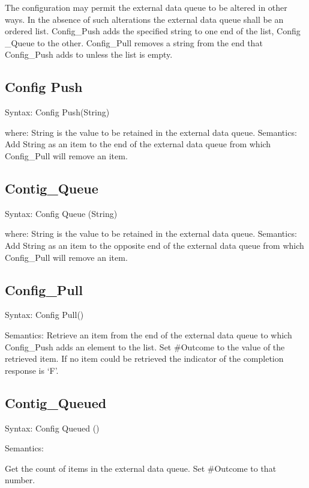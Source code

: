 The configuration may permit the external data queue to be altered in
other ways. In the absence of such alterations the external data queue
shall be an ordered list. Config\_Push adds the specified string to one
end of the list, Config \_Queue to the other. Config\_Pull removes a
string from the end that Config\_Push adds to unless the list is empty.

\hypertarget{config-push}{%
\subsection{Config Push}\label{config-push}}

Syntax: Config Push(String)

where: String is the value to be retained in the external data queue.
Semantics: Add String as an item to the end of the external data queue
from which Config\_Pull will remove an item.

\hypertarget{contig_queue}{%
\subsection{Contig\_Queue}\label{contig_queue}}

Syntax: Config Queue (String)

where: String is the value to be retained in the external data queue.
Semantics: Add String as an item to the opposite end of the external
data queue from which Config\_Pull will remove an item.

\hypertarget{config_pull}{%
\subsection{Config\_Pull}\label{config_pull}}

Syntax: Config Pull()

Semantics: Retrieve an item from the end of the external data queue to
which Config\_Push adds an element to the list. Set \#Outcome to the
value of the retrieved item. If no item could be retrieved the indicator
of the completion response is `F'.

\hypertarget{contig_queued}{%
\subsection{Contig\_Queued}\label{contig_queued}}

Syntax: Config Queued ()

Semantics:

Get the count of items in the external data queue. Set \#Outcome to that
number.

